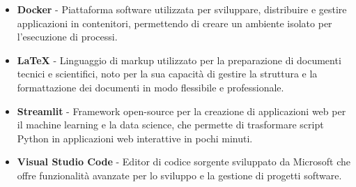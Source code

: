 \begin{itemize}
    \item \textbf{Docker} - Piattaforma software utilizzata per sviluppare, distribuire e gestire applicazioni in contenitori, permettendo di creare un ambiente isolato per l'esecuzione di processi.
    
    \item \textbf{LaTeX} - Linguaggio di markup utilizzato per la preparazione di documenti tecnici e scientifici, noto per la sua capacità di gestire la struttura e la formattazione dei documenti in modo flessibile e professionale.
    
    \item \textbf{Streamlit} - Framework open-source per la creazione di applicazioni web per il machine learning e la data science, che permette di trasformare script Python in applicazioni web interattive in pochi minuti.
    
    
    \item \textbf{Visual Studio Code} - Editor di codice sorgente sviluppato da Microsoft che offre funzionalità avanzate per lo sviluppo e la gestione di progetti software.
\end{itemize}
